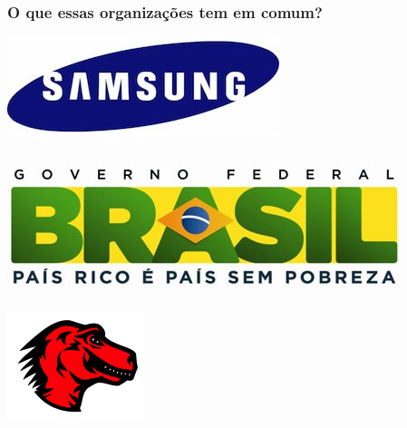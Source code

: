 \documentclass[xcolor=dvipsnames]{beamer}
\begin{document}
\begin{frame}
	\frametitle{O que essas organiza\c{c}\~{o}es tem em comum?}
	\includegraphics[scale=0.38]{samsung.jpg}\hspace{0.8cm}
  \includegraphics[scale=0.20]{brasil.jpg}\hspace{0.8cm}
  \includegraphics[scale=0.45]{mozilla.png}\\[0.3cm] 

\end{frame}
\end{document}
